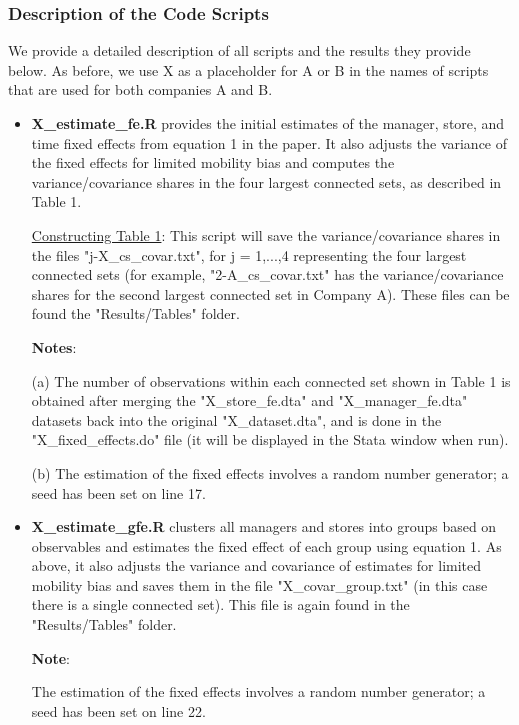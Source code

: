 \documentclass[
]{article}
\begin{document}
\subsubsection{Description of the Code Scripts}

We provide a detailed description of all scripts and the results they provide below. As before, we use X as a placeholder for A or B in the names of scripts that are used for both companies A and B.
\begin{itemize}
    \item \textbf{X\_estimate\_fe.R} provides the initial estimates of the manager, store, and time fixed effects from equation 1 in the paper. It also adjusts the variance of the fixed effects for limited mobility bias and computes the variance/covariance shares in the four largest connected sets, as described in {\color{blue}Table 1}.
    
    \underline{Constructing Table 1}: This script will save the variance/covariance shares in the files "j-X\_cs\_covar.txt", for j = 1,...,4 representing the four largest connected sets (for example, "2-A\_cs\_covar.txt" has the variance/covariance shares for the second largest connected set in Company A). These files can be found the "Results/Tables" folder. 

    \textbf{Notes}: 
    
    (a) The number of observations within each connected set shown in {\color{blue}Table 1} is obtained after merging the "X\_store\_fe.dta" and "X\_manager\_fe.dta" datasets back into the original "X\_dataset.dta", and is done in the "X\_fixed\_effects.do" file (it will be displayed in the Stata window when run).

    (b) The estimation of the fixed effects involves a random number generator; a seed has been set on line 17.

    \item \textbf{X\_estimate\_gfe.R} clusters all managers and stores into groups based on observables and estimates the fixed effect of each group using equation 1. As above, it also adjusts the variance and covariance of estimates for limited mobility bias and saves them in the file "X\_covar\_group.txt" (in this case there is a single connected set). This file is again found in the "Results/Tables" folder.

    \textbf{Note}: 
    
    The estimation of the fixed effects involves a random number generator; a seed has been set on line 22.
\end{itemize}
\end{document}
